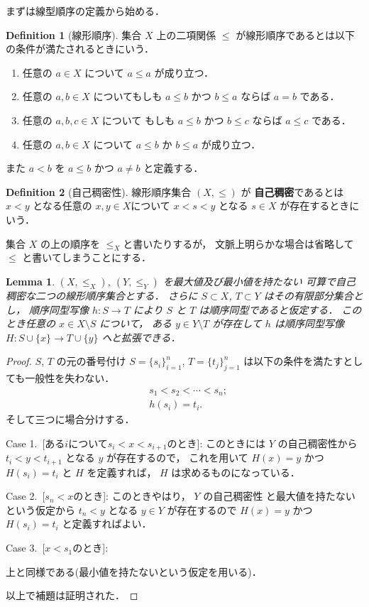 \documentclass[leqno, a4paper, 12pt]{jsarticle}
\theoremstyle{plain}
\newtheorem{lem}[thm]{Lemma}
\theoremstyle{definition}
\newtheorem{df}{Definition}[section]
\theoremstyle{remark}
\newcommand{\yoemph}[1]{\textbf{#1}}
\newcommand{\yocase}[2]{Case #1.~[#2]:}
\numberwithin{equation}{section}
\begin{document}
まずは線型順序の定義から始める．
\begin{df}[線形順序]
集合
$X$
上の二項関係
$\le$
が線形順序であるとは以下の条件が満たされるときにいう．
\begin{enumerate}[label=\textup{(\arabic*)}]
\item 
任意の
$a\in X$
について
$a\le a$
が成り立つ．
\item 
任意の
$a, b\in X$
についてもしも
$a\le b$
かつ
$b\le a$
ならば
$a=b$
である．
\item 
任意の
$a, b, c\in X$
について
もしも
$a\le b$
かつ
$b\le c$
ならば
$a\le c$
である．
\item 
任意の
$a, b\in X$
について
$a\le b$
か
$b\le a$
が成り立つ．
\end{enumerate}
また
$a<b$
を
$a\le b$
かつ
$a\neq b$
と定義する．
\end{df}

\begin{df}[自己稠密性]
線形順序集合
$(X, \le)$
が
\yoemph{自己稠密}であるとは
$x<y$
となる任意の
$x,y\in X$について
$x<s<y$
となる
$s\in X$
が存在するときにいう．
\end{df}
集合
$X$
の上の順序を
$\le_X$と書いたりするが，
文脈上明らかな場合は省略して
$\le$
と書いてしまうことにする．

\begin{lem}\label{lem:sum:junjoextefinite}
$(X,\le_X)$, 
$(Y,\le_Y)$
を最大値及び最小値を持たない
可算で自己稠密な二つの線形順序集合とする．
さらに
$S\subset X$, 
$T\subset Y$
はその有限部分集合とし，
順序同型写像
$h\colon S\to T$
により
$S$
と
$T$
は順序同型であると仮定する．
このとき任意の
$x\in X\setminus S$
について，
ある
$y\in Y\setminus T$
が存在して
$h$
は順序同型写像
$H\colon S\cup\{x\}\to T\cup \{y\}$
へと拡張できる．
\end{lem}
\begin{proof}
$S$,
$T$
の元の番号付け
$S=\{s_{i}\}_{i=1}^{n}$,
$T=\{t_{j}\}_{j=1}^{n}$
は以下の条件を満たすとしても一般性を失わない．
\begin{align}
&s_{1}<s_{2}<\cdots <s_{n}; \\
&h(s_{i})=t_{i}. 
\end{align}
そして三つに場合分けする．

\yocase{1}{ある$i$について$s_{i}<x<s_{i+1}$のとき}
このときには
$Y$
の自己稠密性から
$t_{i}<y<t_{i+1}$
となる
$y$
が存在するので，
これを用いて
$H(x)=y$
かつ
$H(s_{i})=t_{i}$
と
$H$
を定義すれば，
$H$
は求めるものになっている．

\yocase{2}{$s_n<x$のとき}
このときやはり，
$Y$
の自己稠密性
と最大値を持たないという仮定から
$t_{n}<y$
となる
$y\in Y$
が存在するので
$H(x)=y$
かつ
$H(s_{i})=t_{i}$
と定義すればよい．

\yocase{3}{$x<s_1$のとき}


上と同様である(最小値を持たないという仮定を用いる)．

以上で補題は証明された．
\end{proof}
\end{document}
